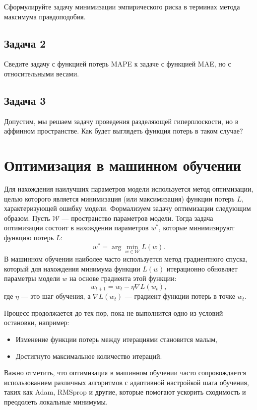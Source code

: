     Сформулируйте задачу минимизации эмпирического риска в терминах метода максимума правдоподобия.

\subsection*{Задача 2}

    Сведите задачу с функцией потерь MAPE к задаче с функцией MAE, но с относительными весами.
    
\subsection*{Задача 3}
    Допустим, мы решаем задачу проведения разделяющей гиперплоскости, но в аффинном пространстве. Как будет выглядеть функция потерь в таком случае?

\section{Оптимизация в машинном обучении}

Для нахождения наилучших параметров модели используется метод оптимизации, целью которого является минимизация (или максимизация) функции потерь \( L \), характеризующей ошибку модели. Формализуем задачу оптимизации следующим образом. Пусть \( \mathcal{W} \) — пространство параметров модели. Тогда задача оптимизации состоит в нахождении параметров \( w^* \), которые минимизируют функцию потерь \( L \):
\[
    w^* = \arg\min_{w \in \mathcal{W}} L(w).
\]
В машинном обучении наиболее часто используется метод градиентного спуска, который для нахождения минимума функции \( L(w) \) итерационно обновляет параметры модели \( w \) на основе градиента этой функции:
\[
    w_{t+1} = w_t - \eta \nabla L(w_t),
\]
где \( \eta \) — это шаг обучения, а \( \nabla L(w_t) \) — градиент функции потерь в точке \( w_t \).

Процесс продолжается до тех пор, пока не выполнится одно из условий остановки, например:
\begin{itemize}
    \item Изменение функции потерь между итерациями становится малым,
    \item Достигнуто максимальное количество итераций.
\end{itemize}

Важно отметить, что оптимизация в машинном обучении часто сопровождается использованием различных алгоритмов с адаптивной настройкой шага обучения, таких как Adam, RMSprop и другие, которые помогают ускорить сходимость и преодолеть локальные минимумы.

